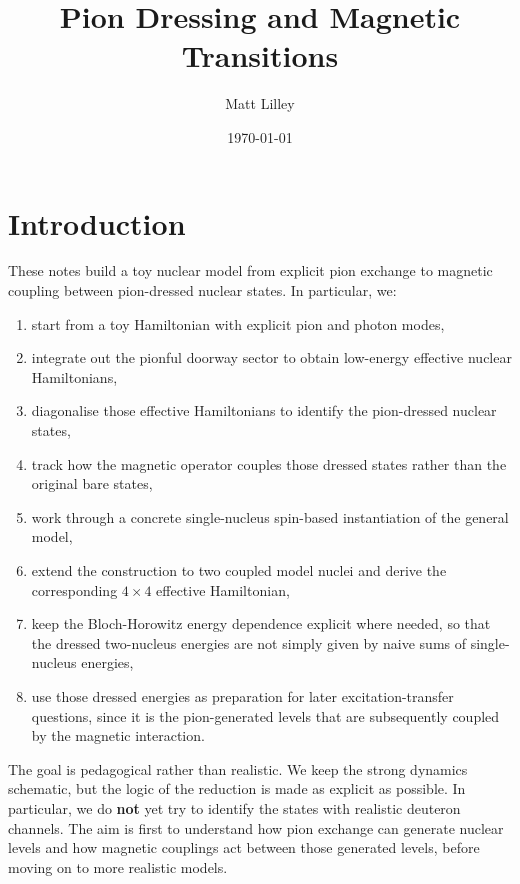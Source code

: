\documentclass[
]{article}
\title{Pion Dressing and Magnetic Transitions}
\author{Matt Lilley}
\date{\today}  %
\renewcommand{\[}{\begin{equation}}
\renewcommand{\]}{\end{equation}}
\providecommand{\tightlist}{%
  \setlength{\itemsep}{0pt}\setlength{\parskip}{0pt}}
\begin{document}
\maketitle

\section{Introduction}\label{introduction}

These notes build a toy nuclear model from explicit pion exchange to
magnetic coupling between pion-dressed nuclear states. In particular,
we:

\begin{enumerate}
\def\labelenumi{\arabic{enumi}.}
\tightlist
\item
  start from a toy Hamiltonian with explicit pion and photon modes,
\item
  integrate out the pionful doorway sector to obtain low-energy
  effective nuclear Hamiltonians,
\item
  diagonalise those effective Hamiltonians to identify the pion-dressed
  nuclear states,
\item
  track how the magnetic operator couples those dressed states rather
  than the original bare states,
\item
  work through a concrete single-nucleus spin-based instantiation of the
  general model,
\item
  extend the construction to two coupled model nuclei and derive the
  corresponding \(4\times4\) effective Hamiltonian,
\item
  keep the Bloch-Horowitz energy dependence explicit where needed, so
  that the dressed two-nucleus energies are not simply given by naive
  sums of single-nucleus energies,
\item
  use those dressed energies as preparation for later
  excitation-transfer questions, since it is the pion-generated levels
  that are subsequently coupled by the magnetic interaction.
\end{enumerate}

The goal is pedagogical rather than realistic. We keep the strong
dynamics schematic, but the logic of the reduction is made as explicit
as possible. In particular, we do \textbf{not} yet try to identify the
states with realistic deuteron channels. The aim is first to understand
how pion exchange can generate nuclear levels and how magnetic couplings
act between those generated levels, before moving on to more realistic
models.
\end{document}
